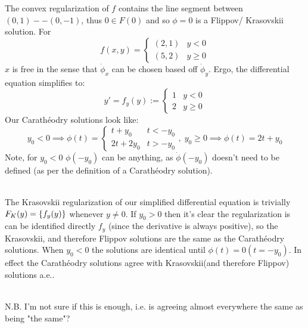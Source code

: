 \documentclass{article}
\newenvironment{ex}[1]
  {\renewcommand\theexercise{#1}\exercise}
  {\endexercise}
\newcommand{\cara}{Carath\'eodry\xspace}
\newcommand{\kras}{Krasovskii\xspace}
\newcommand{\flip}{Flippov\xspace}
\begin{document}
\begin{ex}{1.10}
  The convex regularization of $f$ contains the line segment between $(0, 1) -- (0, -1)$, thus $0 \in F(0)$ and so $\phi = 0$ is a \flip / \kras solution. For
  $$
  f(x, y) = \begin{cases}
    (2, 1) & y < 0 \\
    (5, 2) & y \ge 0
  \end{cases}
  $$
  $x$ is free in the sense that $\dot{\phi}_x$ can be chosen based off $\dot{\phi}_y$. Ergo, the differential equation simplifies to:
  $$
  y' = f_y(y) := \begin{cases}
    1 & y < 0 \\
    2 & y \ge 0
  \end{cases}
  $$
  Our \cara solutions look like:
  $$
  y_0 < 0 \implies \phi(t) = \begin{cases}
    t + y_0 & t < -y_0 \\
    2t + 2y_0 & t > -y_0
  \end{cases}, \; y_0 \ge 0 \implies \phi(t) = 2t + y_0
  $$
  Note, for $y_0 < 0$ $\phi(-y_0)$ can be anything, as $\dot{\phi}(-y_0)$ doesn't need to be defined (as per the definition of a \cara solution).

  \,\\

  The \kras regularization of our simplified differential equation is trivially $F_{K}(y) = \{f_y(y)\}$ whenever $y \ne 0$. If $y_0 > 0$ then it's clear the regularization is can be identified directly $f_y$ (since the derivative is always positive), so the \kras, and therefore \flip solutions are the same as the \cara solutions. When $y_0 < 0$ the solutions are identical until $\phi(t) = 0 (t = -y_0)$. In effect the \cara solutions agree with \kras (and therefore \flip) solutions a.e..

  \,\\
  N.B. I'm not sure if this is enough, i.e. is agreeing almost everywhere the same as being "the same"?


\end{ex}
\end{document}
